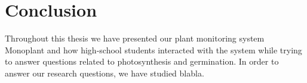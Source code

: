 \chapter{Conclusion}
Throughout this thesis we have presented our plant monitoring system Monoplant and how high-school students interacted with the system while trying to answer questions related to photosynthesis and germination. In order to answer our research questions, we have studied blabla.